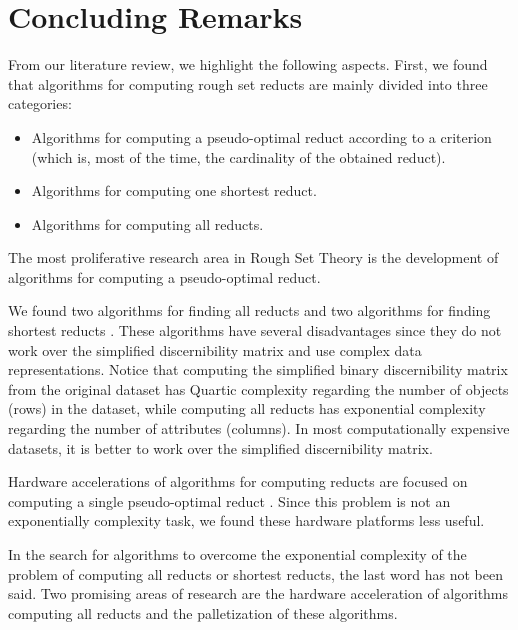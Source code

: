 \documentclass[citenumber]{elsarticle}
\begin{document}
\section{Concluding Remarks}\label{conclusions}
%
   From our literature review, we highlight the following aspects. First, we found that algorithms for computing rough set reducts are mainly divided into three categories:
    \begin{itemize}
  	  \item Algorithms for computing a pseudo-optimal reduct according to a criterion (which is, most of the 
  	  		time, the cardinality of the obtained reduct).
  	  \item Algorithms for computing one shortest reduct.
  	  \item Algorithms for computing all reducts.
    \end{itemize}
    The most proliferative research area in Rough Set Theory is the development of algorithms for computing a 
    pseudo-optimal reduct. 
    
    We found two algorithms for finding all reducts \cite{Starzyk00,WangP07} and two algorithms for finding shortest reducts \cite{Lin04,Jensen14}. These algorithms have several disadvantages since they do not work over the simplified discernibility matrix and use complex data representations. Notice that computing the simplified binary discernibility matrix from the original dataset has Quartic complexity regarding the number of objects (rows) in the dataset, while computing all reducts has exponential complexity regarding the number of attributes (columns). In most computationally expensive datasets, it is better to work over the simplified discernibility matrix. 
    
    Hardware accelerations of algorithms for computing reducts are focused on computing a single pseudo-optimal reduct \cite{Tiwari11,Tiwari12,Tiwari13,Grzes13,Kopczynski14,Tiwari14}. Since this problem is not an exponentially complexity task, we found these hardware platforms less useful.	
		    
    In the search for algorithms to overcome the exponential complexity of the problem of computing all reducts or
    shortest reducts, the last word has not been said. Two promising areas of research are the hardware acceleration of algorithms computing all reducts and the palletization of these algorithms.
  
%


\end{document}
